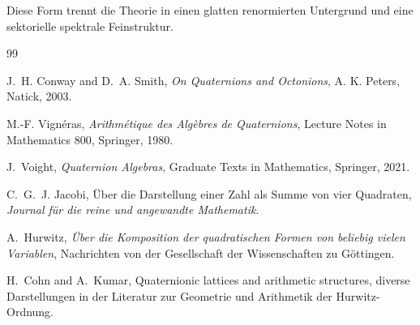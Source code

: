 \documentclass[12pt,a4paper]{article}
\theoremstyle{definition}
\begin{document}
	Diese Form trennt die Theorie in einen glatten renormierten Untergrund und eine sektorielle spektrale Feinstruktur.
	\begin{thebibliography}{99}
		
		J.~H. Conway and D.~A. Smith,
		\emph{On Quaternions and Octonions},
		A. K. Peters, Natick, 2003.
		
		M.-F. Vign\'eras,
		\emph{Arithm\'etique des Alg\`ebres de Quaternions},
		Lecture Notes in Mathematics 800,
		Springer, 1980.
		
		J.~Voight,
		\emph{Quaternion Algebras},
		Graduate Texts in Mathematics,
		Springer, 2021.
		
		C.~G.~J. Jacobi,
		\"Uber die Darstellung einer Zahl als Summe von vier Quadraten,
		\emph{Journal f\"ur die reine und angewandte Mathematik}.
		
		A.~Hurwitz,
		\emph{\"Uber die Komposition der quadratischen Formen von beliebig vielen Variablen},
		Nachrichten von der Gesellschaft der Wissenschaften zu G\"ottingen.
		
		H.~Cohn and A.~Kumar,
		Quaternionic lattices and arithmetic structures,
		diverse Darstellungen in der Literatur zur Geometrie und Arithmetik der Hurwitz-Ordnung.
		
	\end{thebibliography}
	
\end{document}
